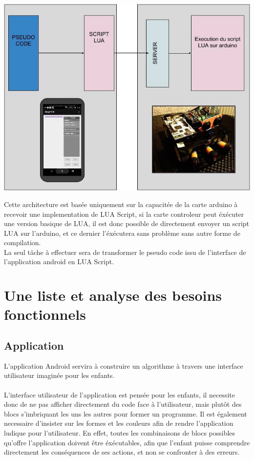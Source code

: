 \documentclass[a4paper]{article}
\begin{document}
\begin{center}
\includegraphics[scale=0.5]{img/archi-lua.jpg}
\end{center}

Cette architecture est basée uniquement sur la capacitée de la carte arduino à recevoir une implementation de LUA Script, si la carte controleur peut éxécuter une version basique de LUA, il est donc possible de directement envoyer un script LUA sur l'arduino, et ce dernier l'éxécutera sans problème sans autre forme de compilation.\\
La seul tâche à effectuer sera de transformer le pseudo code issu de l'interface de l'application android en LUA Script.

\section{Une liste et analyse des besoins fonctionnels}

\subsection{Application}

L’application Android servira à construire un algorithme à travers une interface utilisateur imaginée pour les enfants.

\paragraph{}
L'interface utilisateur de l'application est pensée pour les enfants, il necessite donc de ne pas afficher directement du code face à l'utilisateur, mais plutôt des blocs s'imbriquant les uns les autres pour former un programme. Il est également necessaire d'insister sur les formes et les couleurs afin de rendre l'application ludique pour l'utilisateur. En effet, toutes les combinaisons de blocs possibles qu'offre l'application doivent être éxécutables, afin que l'enfant puisse comprendre directement les conséquences de ses actions, et non se confronter à des erreurs.
\end{document}
